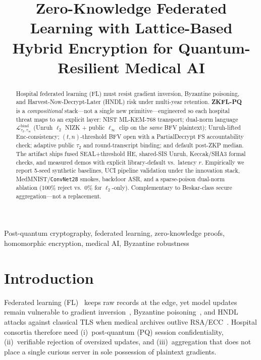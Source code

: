 \documentclass[conference]{IEEEtran}
\begin{document}
\title{Zero-Knowledge Federated Learning with Lattice-Based Hybrid Encryption for Quantum-Resilient Medical AI}

\author{
}

\maketitle
\thispagestyle{empty}

\begin{abstract}
Hospital federated learning (FL) must resist gradient inversion, Byzantine poisoning, and Harvest-Now-Decrypt-Later (HNDL) risk under multi-year retention. \textbf{ZKFL-PQ} is a \emph{compositional} stack---not a single new primitive---engineered so each hospital threat maps to an explicit layer: NIST ML-KEM-768 transport; dual-norm language $\mathcal{L}_{\tau_2,\tau_\infty}^{\mathrm{bind}}$ (Unruh $\ell_2$ NIZK + public $\ell_\infty$ clip on the \emph{same} BFV plaintext); Unruh-lifted Enc-consistency; $(t,n)$-threshold BFV open with a PartialDecrypt FS accountability check; adaptive public $\tau_2$ and round-transcript binding; and default post-ZKP median. The artifact ships fused SEAL+threshold HE, shared-SIS Unruh, Keccak/SHA3 formal checks, and measured demos with explicit library-default vs.\ latency $r$. Empirically we report 5-seed synthetic baselines, UCI pipeline validation under the innovation stack, MedMNIST/\texttt{ConvNet28} smokes, backdoor ASR, and a sparse-poison dual-norm ablation ($100\%$ reject vs.\ $0\%$ for $\ell_2$-only). Complementary to Beskar-class secure aggregation---not a replacement.
\end{abstract}

\begin{IEEEkeywords}
Post-quantum cryptography, federated learning, zero-knowledge proofs, homomorphic encryption, medical AI, Byzantine robustness
\end{IEEEkeywords}

\section{Introduction}
Federated learning (FL)~\cite{mcmahan2017fedavg} keeps raw records at the edge, yet model updates remain vulnerable to gradient inversion~\cite{zhu2019deep}, Byzantine poisoning~\cite{blanchard2017machine}, and HNDL attacks against classical TLS when medical archives outlive RSA/ECC~\cite{mosca2018cybersecurity}. Hospital consortia therefore need (i)~post-quantum (PQ) session confidentiality, (ii)~verifiable rejection of oversized updates, and (iii)~aggregation that does not place a single curious server in sole possession of plaintext gradients.
\end{document}

